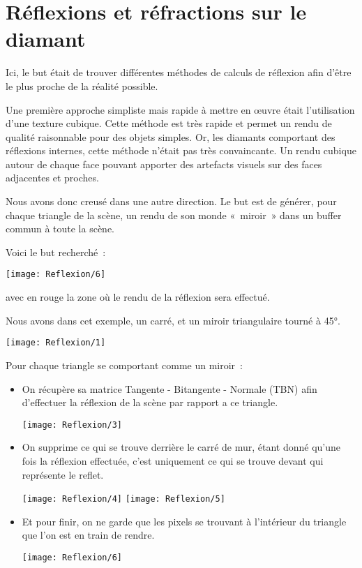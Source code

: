 \section{Réflexions et réfractions sur le diamant}

Ici, le but était de trouver différentes méthodes de calculs de réflexion afin
d'être le plus proche de la réalité possible.

Une première approche simpliste mais
rapide à mettre en œuvre était l'utilisation d'une texture cubique. Cette méthode
est très rapide et permet un rendu de qualité raisonnable pour des objets simples.
Or, les diamants comportant des réflexions internes, cette méthode n'était pas très
convaincante. Un rendu cubique autour de chaque face pouvant apporter des artefacts
visuels sur des faces adjacentes et proches.

Nous avons donc creusé dans une autre direction. Le but est de générer,
pour chaque triangle de la scène,
un rendu de son monde «~miroir~» dans un buffer commun à toute la scène.

Voici le but recherché~:

\texttt{[image: Reflexion/6]}

avec en rouge la zone où le rendu de la réflexion sera effectué.

Nous avons dans cet exemple, un carré, et un miroir triangulaire tourné à 45°.

\texttt{[image: Reflexion/1]}

Pour chaque triangle se comportant comme un miroir~:

\begin{itemize}
    \item On récupère sa matrice Tangente - Bitangente - Normale (TBN) afin
        d'effectuer la réflexion de la scène par rapport a ce triangle.

        \texttt{[image: Reflexion/3]}

    \item On supprime ce qui se trouve derrière le carré de mur, étant donné qu'une
        fois la réflexion effectuée, c'est uniquement ce qui se trouve devant qui
        représente le reflet.

        \texttt{[image: Reflexion/4]}
        \texttt{[image: Reflexion/5]}
    \item Et pour finir, on ne garde que les pixels se trouvant à l'intérieur
        du triangle que l'on est en train de rendre.

        \texttt{[image: Reflexion/6]}
\end{itemize}

